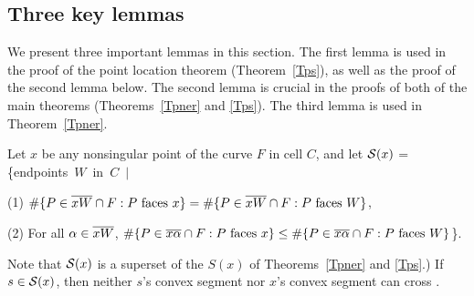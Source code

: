 
\subsection{Three key lemmas}

We present three important lemmas in this section.
The first lemma is used in the proof of the point location theorem (Theorem~\ref{Tps}),
as well as the proof of the second lemma below.
The second lemma is crucial in the proofs of both of the main theorems 
(Theorems~\ref{Tpner} and \ref{Tps}).
The third lemma is used in Theorem~\ref{Tpner}.

\begin{lemma}
\label{lem-argh}
Let $x$ be any nonsingular point of the curve $F$ in cell $C$, and
let ${\cal S}(x)$ = \mbox{\{endpoints $W$ in $C$ $\mid$}

{\rm (1)} \mbox{$\#\{P \in\mbox{$\overline{xW}$}\cap F: P \mbox{ faces $x$}\} =
\#\{P \in \mbox{$\overline{xW}$}\cap F: P \mbox{ faces $W$} \}$},

{\rm (2)} For all $\alpha \in \mbox{$\overline{xW}$}$,
$\#\{P \in\mbox{$\overline{x\alpha}$}\cap F: P \mbox{ faces $x$}\} \leq
\#\{P \in \mbox{$\overline{x\alpha}$}\cap F: P \mbox{ faces $W$}\} $\}.

\vspace{.05in}

\noindent {\rm (}Note that 
${\cal S}(x)$ is a superset of the $S(x)$ of Theorems~{\rm \ref{Tpner}} and {\rm \ref{Tps}.)}
If $s \in {\cal S}(x)$, then neither $s$'s convex segment nor $x$'s convex 
segment can cross .
\end{lemma}

